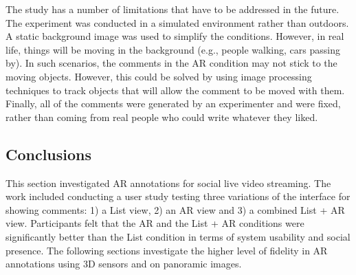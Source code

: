The study has a number of limitations that have to be addressed in the future. The experiment was conducted in a simulated environment rather than outdoors. A static background image was used to simplify the conditions. However, in real life, things will be moving in the background (e.g., people walking, cars passing by). In such scenarios, the comments in the AR condition may not stick to the moving objects. However, this could be solved by using image processing techniques to track objects that will allow the comment to be moved with them. Finally, all of the comments were generated by an experimenter and were fixed, rather than coming from real people who could write whatever they liked.    

\subsection{Conclusions}

This section investigated AR annotations for social live video streaming. The work included conducting a user study testing three variations of the interface for showing comments: 1) a List view, 2) an AR view and 3) a combined List + AR view. Participants felt that the AR and the List + AR conditions were significantly better than the List condition in terms of system usability and social presence. The following sections investigate the higher level of fidelity in AR annotations using 3D sensors and on panoramic images. 